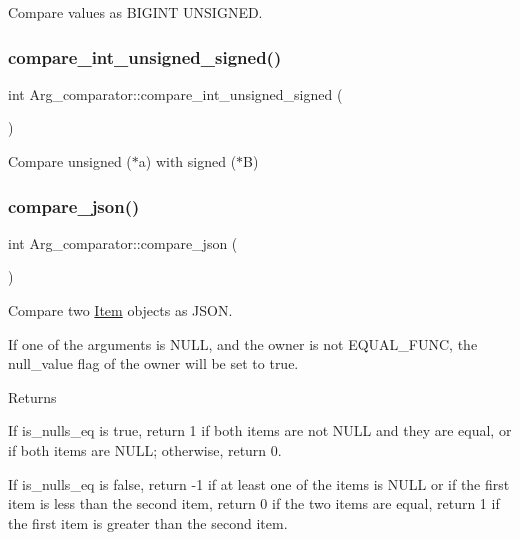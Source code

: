 Compare values as B\+I\+G\+I\+NT U\+N\+S\+I\+G\+N\+ED. \mbox{\label{classArg__comparator_a4099370ecb21ca01a34105665f17271b}} 
\subsubsection{\texorpdfstring{compare\+\_\+int\+\_\+unsigned\+\_\+signed()}{compare\_int\_unsigned\_signed()}}
{\footnotesize\ttfamily int Arg\+\_\+comparator\+::compare\+\_\+int\+\_\+unsigned\+\_\+signed (\begin{DoxyParamCaption}{ }\end{DoxyParamCaption})}

Compare unsigned ($\ast$a) with signed ($\ast$B) \mbox{\label{classArg__comparator_abfac0e9b52332d82c653241793fac38d}} 
\subsubsection{\texorpdfstring{compare\+\_\+json()}{compare\_json()}}
{\footnotesize\ttfamily int Arg\+\_\+comparator\+::compare\+\_\+json (\begin{DoxyParamCaption}{ }\end{DoxyParamCaption})}

Compare two \mbox{\hyperlink{classItem}{Item}} objects as J\+S\+ON.

If one of the arguments is N\+U\+LL, and the owner is not E\+Q\+U\+A\+L\+\_\+\+F\+U\+NC, the null\+\_\+value flag of the owner will be set to true.

\begin{DoxyReturn}{Returns}

\end{DoxyReturn}
If is\+\_\+nulls\+\_\+eq is true, return 1 if both items are not N\+U\+LL and they are equal, or if both items are N\+U\+LL; otherwise, return 0.

If is\+\_\+nulls\+\_\+eq is false, return -\/1 if at least one of the items is N\+U\+LL or if the first item is less than the second item, return 0 if the two items are equal, return 1 if the first item is greater than the second item. \mbox{\label{classArg__comparator_a112f9c09e14094ac8ec253eee291d554}} 
